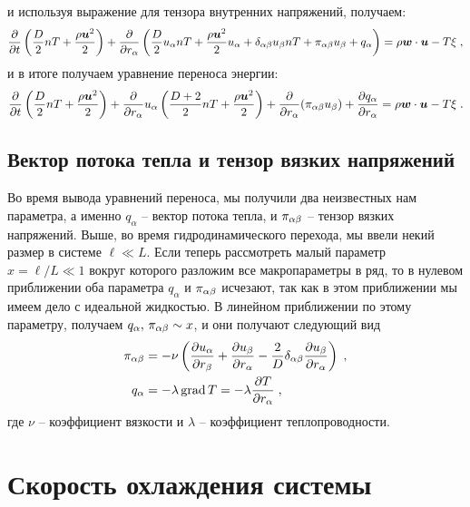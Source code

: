 и используя выражение для тензора внутренних напряжений, получаем:
\begin{equation}
  \frac{\partial}{\partial t}\left(\frac{D}{2}nT+\frac{\rho\bm{u}^2}{2}\right)+
  \frac{\partial}{\partial r_\alpha}\left(\frac{D}{2}u_\alpha nT+\frac{\rho\bm{u}^2}{2}u_\alpha+\delta_{\alpha\beta}u_\beta nT+\pi_{\alpha\beta}u_\beta+q_\alpha\right)=
  \rho\bm{w}\cdot\bm{u}-T\xi\;,
\end{equation}
и в итоге получаем уравнение переноса энергии:
\begin{equation}
  \frac{\partial}{\partial t}\left(\frac{D}{2}nT+\frac{\rho\bm{u}^2}{2}\right)+
  \frac{\partial}{\partial r_\alpha}u_\alpha\left(\frac{D+2}{2}nT+\frac{\rho\bm{u}^2}{2}\right)+\frac{\partial}{\partial r_\alpha}(\pi_{\alpha\beta}u_\beta)
  +\frac{\partial q_\alpha}{\partial r_\alpha}=\rho\bm{w}\cdot\bm{u}-T\xi\;.
\end{equation}

\subsection{Вектор потока тепла и тензор вязких напряжений}

Во время вывода уравнений переноса, мы получили два неизвестных нам параметра, а именно $q_\alpha$ -- вектор потока тепла,
и $\pi_{\alpha\beta}$ -- тензор вязких напряжений. Выше, во время гидродинамического перехода, мы ввели некий размер в системе 
$\ell\ll L$. Если теперь рассмотреть малый параметр $x=\ell/L\ll 1$ вокруг которого разложим все макропараметры в ряд, то
в нулевом приближении оба параметра $q_\alpha$ и $\pi_{\alpha\beta}$ исчезают, так как в этом приближении мы имеем дело с идеальной
жидкостью. В линейном приближении по этому параметру, получаем $q_\alpha,\,\pi_{\alpha\beta}\sim x$, и они получают следующий вид
\begin{equation}\label{eq:viscosity_coeff}
  \begin{split}
    \pi_{\alpha\beta} &= -\nu\left(\frac{\partial u_\alpha}{\partial r_\beta}+\frac{\partial u_\beta}{\partial r_\alpha}
    -\frac{2}{D}\delta_{\alpha\beta}\frac{\partial u_\beta}{\partial r_\alpha}\right)\;,\\
    q_\alpha &= -\lambda\,\mbox{grad}\,T = -\lambda\frac{\partial T}{\partial r_\alpha}\;,
  \end{split}
\end{equation}
где $\nu$ -- коэффициент вязкости и $\lambda$ -- коэффициент теплопроводности.

\section{Скорость охлаждения системы}


